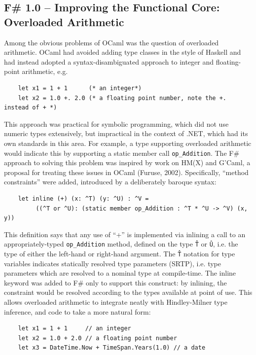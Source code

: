 \documentclass[acmsmall]{acmart}\settopmatter{}
\begin{document}
\subsection*{F\# 1.0 – Improving the Functional Core: Overloaded Arithmetic }

Among the obvious problems of OCaml was the question of overloaded arithmetic.  OCaml had avoided adding type classes in the style of Haskell and had instead adopted a syntax-disambiguated approach to integer and floating-point arithmetic, e.g.

\begin{verbatim}
    let x1 = 1 + 1      (* an integer*)
    let x2 = 1.0 +. 2.0 (* a floating point number, note the +. instead of + *)
\end{verbatim}

This approach was practical for symbolic programming, which did not use numeric types extensively, but impractical in the context of .NET, which had its own standards in this area. For example, a type supporting overloaded arithmetic would indicate this by supporting a static member call \texttt{op\_Addition}. The F\# approach to solving this problem was inspired by work on HM(X) and G'Caml, a proposal for treating these issues in OCaml (Furuse, 2002).  Specifically, “method constraints” were added, introduced by a deliberately baroque syntax:

\begin{verbatim}
    let inline (+) (x: ^T) (y: ^U) : ^V = 
         ((^T or ^U): (static member op_Addition : ^T * ^U -> ^V) (x, y))
\end{verbatim}

This definition says that any use of “+” is implemented via inlining a call to an appropriately-typed \texttt{op\_Addition} method, defined on the type \texttt{\^T} or \texttt{\^U}, i.e. the type of either the left-hand or right-hand argument.  The \texttt{\^T} notation for type variables indicates statically resolved type parameters (SRTP), i.e. type parameters which are resolved to a nominal type at compile-time.  The inline keyword was added to F\# only to support this construct: by inlining, the constraint would be resolved according to the types available at point of use. This allows overloaded arithmetic to integrate neatly with Hindley-Milner type inference, and code to take a more natural form:

\begin{verbatim}
    let x1 = 1 + 1     // an integer
    let x2 = 1.0 + 2.0 // a floating point number
    let x3 = DateTime.Now + TimeSpan.Years(1.0) // a date
\end{verbatim}
\end{document}
